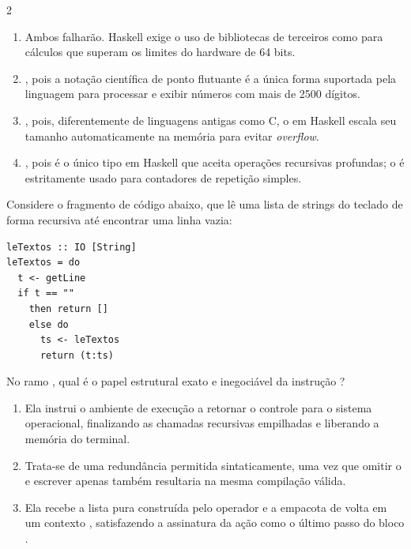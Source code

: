 \documentclass[a4paper,10pt,brazil]{article}
\begin{document}
\begin{multicols}{2}
\begin{enumerate}
  \item Ambos falharão. Haskell exige o uso de bibliotecas de terceiros como  para cálculos que superam os limites do hardware de 64 bits.

  \item {}, pois a notação científica de ponto flutuante é a única forma suportada pela linguagem para processar e exibir números com mais de 2500 dígitos.

  \item {}, pois, diferentemente de linguagens antigas como C, o  em Haskell escala seu tamanho automaticamente na memória para evitar \emph{overflow}.

  \item {}, pois é o único tipo em Haskell que aceita operações recursivas profundas; o  é estritamente usado para contadores de repetição simples.


\end{enumerate}

Considere o fragmento de código abaixo, que lê uma lista de strings do teclado de forma recursiva até encontrar uma linha vazia:

\begin{verbatim}
leTextos :: IO [String]
leTextos = do
  t <- getLine
  if t == "" 
    then return []
    else do
      ts <- leTextos
      return (t:ts)
\end{verbatim}

No ramo , qual é o papel estrutural exato e inegociável da instrução ?

\begin{enumerate}
  \item Ela instrui o ambiente de execução a retornar o controle para o sistema operacional, finalizando as chamadas recursivas empilhadas e liberando a memória do terminal.

  \item Trata-se de uma redundância permitida sintaticamente, uma vez que omitir o  e escrever apenas  também resultaria na mesma compilação válida.

  \item Ela recebe a lista pura construída pelo operador \haskellinline{(:)} e a empacota de volta em um contexto , satisfazendo a assinatura da ação como o último passo do bloco .


\end{enumerate}
\end{multicols}
\end{document}
